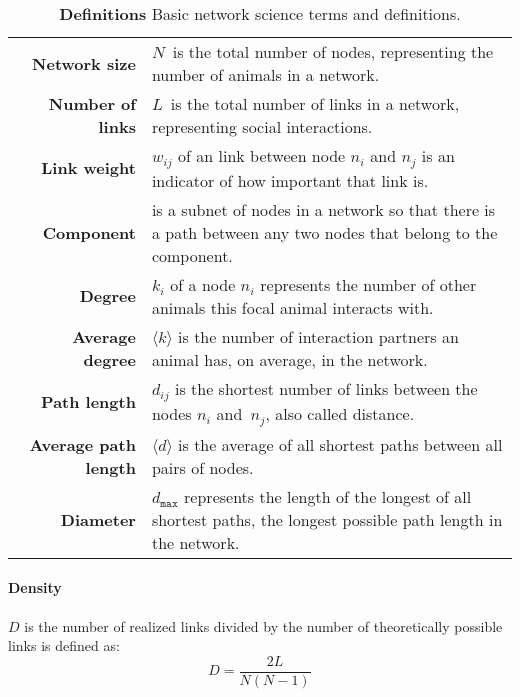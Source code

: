 \begin{table}[!bp]
\small
\caption[Definitions]{\textbf{Definitions} Basic network science terms and definitions.}
\label{tab:theory}
\vspace{3mm}
\colorbox{usethiscolorhere}{
\centering
\begin{tabularx}{\textwidth}{@{} r Y @{}}
	\textbf{Network size} &
	$N$~is the total number of nodes, representing the number of animals in a network.\vspace{2mm}\\
	\textbf{Number of links} &
	$L$~is the total number of links in a network, representing social interactions.\vspace{2mm}\\
	\textbf{Link weight} &
	$w_{ij}$ of an link between node $n_i$ and $n_j$ is an indicator of how important that link is.\vspace{2mm}\\
	\textbf{Component} &
	is a subnet of nodes in a network so that there is a path between any two nodes that belong to the component.\vspace{2mm}\\
	\textbf{Degree} &
	$k_i$ of a node $n_i$ represents the number of other animals this focal animal interacts with.\vspace{2mm}\\
	\textbf{Average degree} &
	$\langle k \rangle$ is the number of interaction partners an animal has, on average, in the network.\vspace{2mm}\\
	\textbf{Path length} & $d_{ij}$ is the shortest number of links between the nodes $n_i$ and~$n_j$, also called distance.\vspace{2mm}\\
	\textbf{Average path length} & $\langle d \rangle$ is the average of all shortest paths between all pairs of nodes.\vspace{2mm}\\
	\textbf{Diameter} & $d_{\texttt{max}}$ represents the length of the longest of all shortest paths, the longest possible path length in the network.\\
\end{tabularx}
}
\end{table}

\paragraph{Density} $D$ is the number of realized links divided by the number
of theoretically possible links is defined as: $$D=\frac{2L}{N(N-1)}$$

